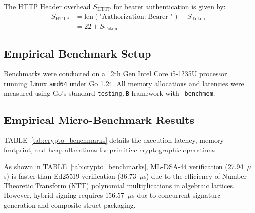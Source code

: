 \documentclass[conference]{IEEEtran}
\begin{document}
The HTTP Header overhead $S_{\text{HTTP}}$ for bearer authentication is given by:
\begin{equation}
\begin{split}
S_{\text{HTTP}} &= \text{len}(\text{"Authorization: Bearer "}) + S_{\text{Token}} \\
&= 22 + S_{\text{Token}}
\end{split}
\end{equation}

\subsection{Empirical Benchmark Setup}
Benchmarks were conducted on a 12th Gen Intel Core i5-1235U processor running Linux \texttt{amd64} under Go 1.24. All memory allocations and latencies were measured using Go's standard \texttt{testing.B} framework with \texttt{-benchmem}.

\subsection{Empirical Micro-Benchmark Results}

TABLE~\ref{tab:crypto_benchmarks} details the execution latency, memory footprint, and heap allocations for primitive cryptographic operations.

\begin{table}[htbp]
\caption{Empirical Cryptographic Primitives Micro-Benchmarks}
\label{tab:crypto_benchmarks}
\centering
{}
\end{table}

As shown in TABLE~\ref{tab:crypto_benchmarks}, ML-DSA-44 verification (27.94~$\mu$s) is faster than Ed25519 verification (36.73~$\mu$s) due to the efficiency of Number Theoretic Transform (NTT) polynomial multiplications in algebraic lattices. However, hybrid signing requires 156.57~$\mu$s due to concurrent signature generation and composite struct packaging.
\end{document}
